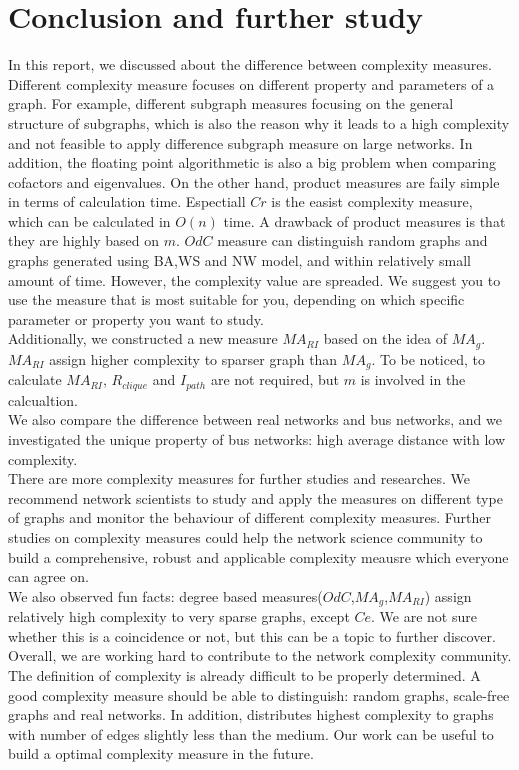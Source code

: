 \documentclass[12pt]{article}
\begin{document}
\section{Conclusion and further study}
In this report, we discussed about the difference between complexity measures. Different complexity measure focuses on different property and parameters of a graph. For example, different subgraph measures focusing on the general structure of subgraphs, which is also the reason why it leads to a high complexity and not feasible to apply difference subgraph measure on large networks. In addition, the floating point algorithmetic is also a big problem when comparing cofactors and eigenvalues.
On the other hand, product measures are faily simple in terms of calculation time. Espectiall $Cr$ is the easist complexity measure, which can be calculated in $O(n)$ time\cite{KIM20082637}. A drawback of product measures is that they are highly based on $m$.
$OdC$ measure can distinguish random graphs and graphs generated using BA,WS and NW model, and within relatively small amount of time. However, the complexity value are spreaded. We suggest you to use the measure that is most suitable for you, depending on which specific parameter or property you want to study.\\
Additionally, we constructed a new measure $MA_{RI}$ based on the idea of $MA_g$. $MA_{RI}$ assign higher complexity to sparser graph than $MA_g$. To be noticed, to calculate $MA_{RI}$, $R_{clique}$ and $I_{path}$ are not required, but $m$ is involved in the calcualtion.\\
We also compare the difference between real networks and bus networks, and we investigated the unique property of bus networks: high average distance with low complexity.\\
There are more complexity measures\cite{emmert-streib_dehmer_2012}\cite{dehmer_barbarini_varmuza_graber_2009} for further studies and researches. We recommend network scientists to study and apply the measures on different type of graphs and monitor the behaviour of different complexity measures. Further studies on complexity measures could help the network science community to build a comprehensive, robust and applicable complexity meausre which everyone can agree on.\\
We also observed fun facts: degree based measures($OdC$,$MA_g$,$MA_{RI}$) assign relatively high complexity to very sparse graphs, except $Ce$. We are not sure whether this is a coincidence or not, but this can be a topic to further discover.\\
Overall, we are working hard to contribute to the network complexity community. The definition of complexity is already difficult to be properly determined. A good complexity measure should be able to distinguish: random graphs, scale-free graphs and real networks. In addition, distributes highest complexity to graphs with number of edges slightly less than the medium. Our work can be useful to build a optimal complexity measure in the future.
\end{document}
